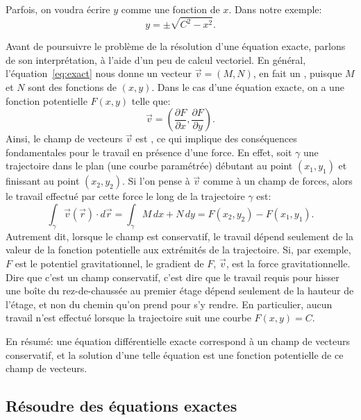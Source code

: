 Parfois, on voudra écrire $y$ comme une fonction de $x$.  Dans notre exemple:
\begin{equation*}
	y = \pm \sqrt{C^2-x^2} .
\end{equation*}

Avant de poursuivre le problème de la résolution d'une équation exacte, parlons de son interprétation, à l'aide d'un peu de calcul vectoriel.
En général, l'équation~\eqref{eq:exact} nous donne un vecteur $\vec{v} = (M,N)$, en fait un \emph{},
puisque $M$ et $N$ sont des fonctions de $(x,y)$.
Dans le cas d'une équation exacte, on a une fonction potentielle $F(x,y)$ telle que:
\begin{equation*}
	\vec{v} = \left( \frac{\partial F}{\partial x} ,\frac{\partial F}{\partial y} \right) .
\end{equation*}
Ainsi, le champ de vecteurs $\vec{v}$ est \emph{},
ce qui implique des conséquences fondamentales pour le travail en présence d'une force.
En effet, soit $\gamma$ une trajectoire dans le plan (une courbe paramétrée) débutant au point $(x_1,y_1)$
et finissant au point $(x_2,y_2)$.
Si l'on pense à $\vec{v}$ comme à un champ de forces, alors le travail effectué par cette force
le long de la trajectoire $\gamma$ est:
\begin{equation*}
	\int_\gamma \vec{v}(\vec{r}) \cdot d\vec{r}
	= \int_\gamma M \, dx + N \, dy
	= F(x_2,y_2) - F(x_1,y_1) .
\end{equation*}
Autrement dit, lorsque le champ est conservatif, le travail dépend seulement de la valeur de la fonction potentielle aux extrémités de la trajectoire.
Si, par exemple, $F$ est le potentiel gravitationnel, le gradient de $F$, $\vec{v}$, est la force gravitationnelle.
Dire que c'est un champ conservatif, c'est dire que le travail requis pour hisser une boîte du rez-de-chaussée au premier étage
dépend seulement de la hauteur de l'étage, et non du chemin qu'on prend pour s'y rendre.
En particulier, aucun travail n'est effectué lorsque la trajectoire suit une courbe $F(x,y) = C$.

En résumé: une équation différentielle exacte correspond à un champ de vecteurs conservatif,
et la solution d'une telle équation est une fonction potentielle de ce champ de vecteurs.


\subsection{Résoudre des équations exactes}

